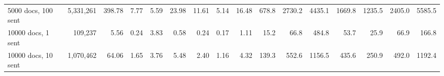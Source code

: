 \begin{table}[!h]
{\begin{tabular}[t]{lrrrrrrrrrrrrrrr}
5000 docs, 100 sent & 5,331,261 & 398.78 & 7.77 & 5.59 & 23.98 & 11.61 & 5.14 & 16.48 & 678.8 & 2730.2 & 4435.1 & 1669.8 & 1235.5 & 2405.0 & 5585.5\\
10000 docs, 1 sent & 109,237 & 5.56 & 0.24 & 3.83 & 0.58 & 0.24 & 0.17 & 1.11 & 15.2 & 66.8 & 484.8 & 53.7 & 25.9 & 66.9 & 166.8\\
10000 docs, 10 sent & 1,070,462 & 64.06 & 1.65 & 3.76 & 5.48 & 2.40 & 1.16 & 4.32 & 139.3 & 552.6 & 1156.5 & 435.6 & 250.9 & 492.0 & 1192.4\\
\bottomrule
\end{tabular}}
\end{table}
